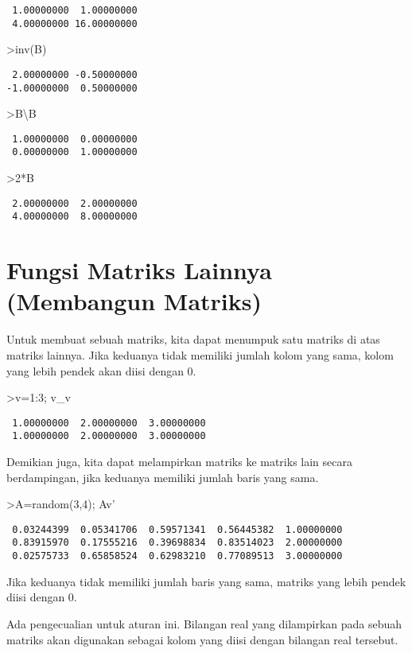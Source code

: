 \documentclass[
]{book}
\begin{document}
\begin{verbatim}
 1.00000000  1.00000000 
 4.00000000 16.00000000 
\end{verbatim}

\textgreater inv(B)

\begin{verbatim}
 2.00000000 -0.50000000 
-1.00000000  0.50000000 
\end{verbatim}

\textgreater B\textbackslash B

\begin{verbatim}
 1.00000000  0.00000000 
 0.00000000  1.00000000 
\end{verbatim}

\textgreater2*B

\begin{verbatim}
 2.00000000  2.00000000 
 4.00000000  8.00000000 
\end{verbatim}

\chapter{Fungsi Matriks Lainnya (Membangun Matriks)}\label{fungsi-matriks-lainnya-membangun-matriks}

Untuk membuat sebuah matriks, kita dapat menumpuk satu matriks di atas matriks lainnya. Jika keduanya tidak memiliki jumlah kolom yang sama, kolom yang lebih pendek akan diisi dengan 0.

\textgreater v=1:3; v\_v

\begin{verbatim}
 1.00000000  2.00000000  3.00000000 
 1.00000000  2.00000000  3.00000000 
\end{verbatim}

Demikian juga, kita dapat melampirkan matriks ke matriks lain secara berdampingan, jika keduanya memiliki jumlah baris yang sama.

\textgreater A=random(3,4); A\textbar v'

\begin{verbatim}
 0.03244399  0.05341706  0.59571341  0.56445382  1.00000000 
 0.83915970  0.17555216  0.39698834  0.83514023  2.00000000 
 0.02575733  0.65858524  0.62983210  0.77089513  3.00000000 
\end{verbatim}

Jika keduanya tidak memiliki jumlah baris yang sama, matriks yang lebih pendek diisi dengan 0.

Ada pengecualian untuk aturan ini. Bilangan real yang dilampirkan pada sebuah matriks akan digunakan sebagai kolom yang diisi dengan bilangan real tersebut.
\end{document}
